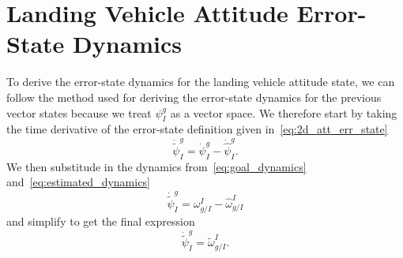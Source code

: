 \section{Landing Vehicle Attitude Error-State Dynamics}
To derive the error-state dynamics for the landing vehicle attitude state,
we can follow the method used for deriving the error-state dynamics for the
previous vector states because we treat $\psi_I^g$ as a vector space. We
therefore start by taking the time derivative of the error-state definition
given in~\eqref{eq:2d_att_err_state}
\begin{equation}
  \dot{\tilde{\psi}}_I^g = \dot{\psi}_I^g - \dot{\hat{\psi}}_I^g.
\end{equation}
We then substitude in the dynamics from~\eqref{eq:goal_dynamics}
and~\eqref{eq:estimated_dynamics} 
\begin{equation}
  \dot{\tilde{\psi}}_I^g = \omega_{g/I}^I - \hat{\omega}_{g/I}^I
\end{equation}
and simplify to get the final expression
\begin{equation}
  \dot{\tilde{\psi}}_I^g = \tilde{\omega}_{g/I}^I.
\end{equation}


